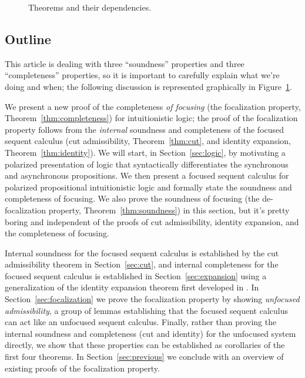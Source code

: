 \documentclass[acmtocl]{robtrans}\pdfoutput=1
\begin{document}
\begin{figure}
\begin{center}
\end{center}
\caption{Theorems and their dependencies.}
\label{fig:outline}
\end{figure}

\subsection{Outline}

This article is dealing with three ``soundness'' properties and three
``completeness'' properties, so it is important to carefully 
explain what we're doing and when; the following discussion is represented
graphically in Figure~\ref{fig:outline}.

We present a new proof of the completeness {\it of focusing} (the
focalization property, Theorem~\ref{thm:completeness}) for
intuitionistic logic; the proof of the focalization property follows
from the {\it internal} soundness and completeness of the focused
sequent calculus (cut admissibility, Theorem~\ref{thm:cut}, and
identity expansion, Theorem~\ref{thm:identity}).  We will start, in
Section~\ref{sec:logic}, by motivating a polarized presentation of
logic that syntactically differentiates the synchronous and
asynchronous propositions. We then present a focused sequent calculus
for polarized propositional intuitionistic logic and formally state
the soundness and completeness of focusing. We also prove the
soundness of focusing (the de-focalization property,
Theorem~\ref{thm:soundness}) in this section, but it's pretty boring
and independent of the proofs of cut admissibility, identity
expansion, and the completeness of focusing.

Internal soundness for the focused sequent calculus is established by
the cut admissibility theorem in Section~\ref{sec:cut}, and internal
completeness for the focused sequent calculus is established in
Section~\ref{sec:expansion} using a generalization of the identity
expansion theorem first developed in \cite{simmons11weak}. In
Section~\ref{sec:focalization} we prove the focalization property by
showing {\it unfocused admissibility}, a group of lemmas establishing
that the focused sequent calculus can act like an unfocused sequent
calculus.  Finally, rather than proving the internal soundness and
completeness (cut and identity) for the unfocused system directly, we
show that these properties can be established as corollaries of the
first four theorems.  In Section~\ref{sec:previous} we conclude with
an overview of existing proofs of the focalization property.
\end{document}
